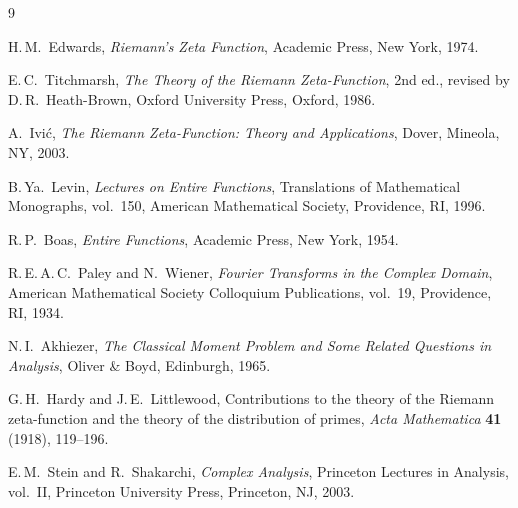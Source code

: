 \documentclass[11pt,a4paper]{article}
\theoremstyle{plain}
\theoremstyle{definition}
\begin{document}
\begin{thebibliography}{9}

H.\,M.~Edwards, \emph{Riemann's Zeta Function}, Academic Press, New York, 1974.

E.\,C.~Titchmarsh, \emph{The Theory of the Riemann Zeta-Function}, 2nd ed., revised by D.\,R.~Heath-Brown, Oxford University Press, Oxford, 1986.

A.~Ivi\'c, \emph{The Riemann Zeta-Function: Theory and Applications}, Dover, Mineola, NY, 2003.

B.\,Ya.~Levin, \emph{Lectures on Entire Functions}, Translations of Mathematical Monographs, vol.~150, American Mathematical Society, Providence, RI, 1996.

R.\,P.~Boas, \emph{Entire Functions}, Academic Press, New York, 1954.

R.\,E.\,A.\,C.~Paley and N.~Wiener, \emph{Fourier Transforms in the Complex Domain}, American Mathematical Society Colloquium Publications, vol.~19, Providence, RI, 1934.

N.\,I.~Akhiezer, \emph{The Classical Moment Problem and Some Related Questions in Analysis}, Oliver \& Boyd, Edinburgh, 1965.

G.\,H.~Hardy and J.\,E.~Littlewood, Contributions to the theory of the Riemann zeta-function and the theory of the distribution of primes, \emph{Acta Mathematica} \textbf{41} (1918), 119--196.

E.\,M.~Stein and R.~Shakarchi, \emph{Complex Analysis}, Princeton Lectures in Analysis, vol.~II, Princeton University Press, Princeton, NJ, 2003.

\end{thebibliography}
\end{document}
